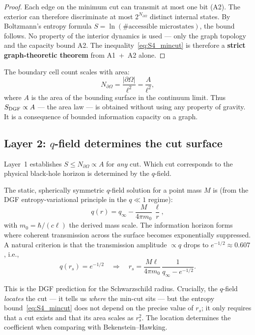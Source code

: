 \documentclass[aps,prd,twocolumn,superscriptaddress,nofootinbib,floatfix]{revtex4-2}
\begin{document}
\begin{proof}
Each edge on the minimum cut can transmit at most one bit (A2).  The
exterior can therefore discriminate at most $2^{N_{\partial\Omega}}$
distinct internal states.  By Boltzmann's entropy formula
$S = \ln(\text{\# accessible microstates})$, the bound follows.
No property of the interior dynamics is used --- only the graph topology
and the capacity bound A2.  The inequality~\eqref{eq:S4_mincut} is
therefore a \textbf{strict graph-theoretic theorem} from A1~+~A2 alone.
\end{proof}

The boundary cell count scales with area:
\begin{equation}
  N_{\partial\Omega} = \frac{|\partial\Omega|}{\ell^2}
  = \frac{A}{\ell^2},
  \label{eq:S4_Narea}
\end{equation}
where $A$ is the area of the bounding surface in the continuum limit.
Thus $S_{\rm DGF} \propto A$ --- the area law --- is obtained without using
any property of gravity.  It is a consequence of bounded information capacity
on a graph.

\subsection{Layer 2: $q$-field determines the cut surface}
\label{sec:S4_layer2}

Layer~1 establishes $S\le N_{\partial\Omega}\propto A$ for \emph{any} cut.
Which cut corresponds to the physical black-hole horizon is determined by the
$q$-field.

The static, spherically symmetric $q$-field solution for a point mass $M$ is
(from the DGF entropy-variational principle in the $q\ll 1$ regime):
\begin{equation}
  q(r) = q_\infty - \frac{M}{4\pi m_0}\,\frac{\ell}{r},
  \label{eq:S4_qfield}
\end{equation}
with $m_0 = \hbar/(c\ell)$ the derived mass scale.  The information horizon
forms where coherent transmission across the surface becomes exponentially
suppressed.  A natural criterion is that the transmission amplitude
$\propto q$ drops to $e^{-1/2}\approx 0.607$, i.e.,
\begin{equation}
  q(r_s) = e^{-1/2}\quad\Longrightarrow\quad
  r_s = \frac{M\ell}{4\pi m_0}\,
        \frac{1}{q_\infty - e^{-1/2}}.
  \label{eq:S4_rs}
\end{equation}

This is the DGF prediction for the Schwarzschild radius.  Crucially, the
$q$-field \emph{locates} the cut --- it tells us \emph{where} the min-cut
sits --- but the entropy bound~\eqref{eq:S4_mincut} does not depend on the
precise value of $r_s$; it only requires that a cut exists and that its area
scales as $r_s^2$.  The location determines the coefficient when comparing
with Bekenstein--Hawking.
\end{document}
